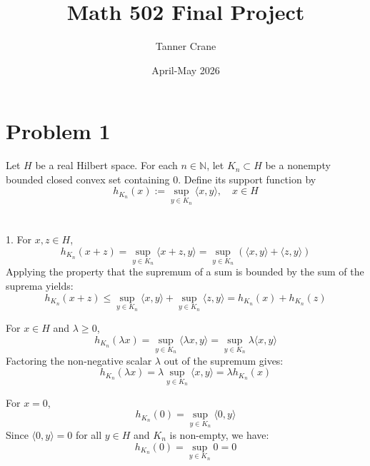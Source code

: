 \documentclass{article}
\title{Math 502 Final Project}
\author{Tanner Crane}
\date{April-May 2026}
\begin{document}
\maketitle

\section{Problem 1}
 Let $H$ be a real Hilbert space. For each $n \in \mathbb{N}$, let $K_n \subset H$ be a nonempty bounded closed convex set containing $0$. Define its support function by
\[
h_{K_n}(x) := \sup_{y \in K_n} \langle x, y \rangle, \quad x \in H
\]
\\
\\
1.
For $x, z \in H$,
 \[
 h_{K_n}(x + z) = \sup_{y \in K_n} \langle x + z, y \rangle = \sup_{y \in K_n} (\langle x, y \rangle + \langle z, y \rangle)
\]
Applying the property that the supremum of a sum is bounded by the sum of the suprema yields:
 \[
 h_{K_n}(x + z) \leq \sup_{y \in K_n} \langle x, y \rangle + \sup_{y \in K_n} \langle z, y \rangle = h_{K_n}(x) + h_{K_n}(z)
\]

For $x \in H$ and $\lambda \geq 0$,
\[
 h_{K_n}(\lambda x) = \sup_{y \in K_n} \langle \lambda x, y \rangle = \sup_{y \in K_n} \lambda \langle x, y \rangle
\]
Factoring the non-negative scalar $\lambda$ out of the supremum gives:
\[
h_{K_n}(\lambda x) = \lambda \sup_{y \in K_n} \langle x, y \rangle = \lambda h_{K_n}(x)
 \]

For $x = 0$,
\[
h_{K_n}(0) = \sup_{y \in K_n} \langle 0, y \rangle
\]
Since $\langle 0, y \rangle = 0$ for all $y \in H$ and $K_n$ is non-empty, we have:
\[
 h_{K_n}(0) = \sup_{y \in K_n} 0 = 0
\]
\end{document}
